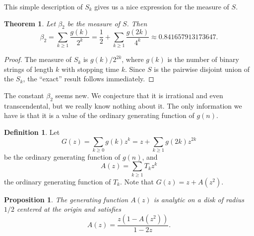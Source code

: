\documentclass[12pt]{article}
\newtheorem{theorem}{Theorem}
\newtheorem{proposition}{Proposition}
\theoremstyle{definition}
\newtheorem{definition}{Definition}
\begin{document}
This simple description of $S_k$ gives us a nice expression for the measure of
$S$.

\begin{theorem}
    Let $\beta_2$ be the measure of $S$. Then
    \begin{equation*}
        \beta_2 = \sum_{k \geq 1} \frac{g(k)}{2^k} = \frac{1}{2} + \sum_{k \geq 1} \frac{g(2k)}{4^k}
        \approx 0.841657913173647.
    \end{equation*}
\end{theorem}

\begin{proof}
    The measure of $S_k$ is $g(k) / 2^{2k}$, where $g(k)$ is the number of
    binary strings of length $k$ with stopping time $k$. Since $S$ is the
    pairwise disjoint union of the $S_k$, the ``exact'' result follows
    immediately.
\end{proof}

The constant $\beta_2$ seems new. We conjecture that it is irrational and even
transcendental, but we really know nothing about it. The only information we
have is that it is a value of the ordinary generating function of $g(n)$.

\begin{definition}
    Let
    \begin{equation*}
        G(z) = \sum_{k \geq 0} g(k) z^k = z + \sum_{k \geq 1} g(2k) z^{2k}
    \end{equation*}
    be the ordinary generating function of $g(n)$, and
    \begin{equation*}
        A(z) = \sum_{k \geq 1} T_k z^k
    \end{equation*}
    the ordinary generating function of $T_k$. Note that $G(z) = z + A(z^2)$.
\end{definition}

\begin{proposition}
    The generating function $A(z)$ is analytic on a disk of radius $1 / 2$
    centered at the origin and satisfies
    \begin{equation*}
        A(z) = \frac{z(1 - A(z^2))}{1 - 2z}.
    \end{equation*}
\end{proposition}
\end{document}
